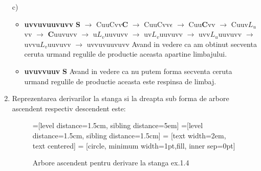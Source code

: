 \begin{enumerate}
\begin{enumerate}
\item[c)]
\begin{itemize}
\item \textbf{uvvuvuuvuvv}\newline
\textbf{S} $\rightarrow$ CuuCvv\textbf{C} $\rightarrow$ CuuCvv\textbf{$\epsilon$} $\rightarrow$ Cuu\textbf{C}vv $\rightarrow$ Cuuv\textbf{$L_{u}$}vv $\rightarrow$ \textbf{C}uuvuvv $\rightarrow$ u\textbf{$L_{v}$}uuvuvv $\rightarrow$ uv\textbf{$L_{v}$}uuvuvv $\rightarrow$ uvv\textbf{$L_{u}$}uuvuvv $\rightarrow$ uvvu\textbf{$L_{v}$}uuvuvv $\rightarrow$ uvvuvuuvuvv \newline
Avand in vedere ca am obtinut secventa ceruta urmand regulile de productie aceasta apartine limbajului.
\item \textbf{uvuvvuuv}\newline
\textbf{S} \newline
Avand in vedere ca nu putem forma secventa ceruta urmand regulile de productie aceasta este respinsa de limbaj.
\end{itemize}
\item Reprezentarea derivarilor la stanga si la dreapta sub forma de arbore ascendent respectiv descendent este:

\begin{figure}[H]
=[level distance=1.5cm, sibling distance=5em]
=[level distance=1.5cm, sibling distance=1.5cm]
 = [text width=2em, text centered]
 = [circle, minimum width=1pt,fill, inner sep=0pt]
\caption{Arbore ascendent pentru derivare la stanga ex.1.4}
\end{figure}


\end{enumerate}
\end{enumerate}
